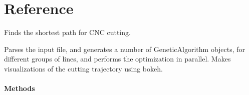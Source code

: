 \documentclass[letterpaper,10pt,english,openany,oneside]{sphinxmanual}
\begin{document}
\chapter{Reference}
\label{\detokenize{reference:module-cnc.optimization}}\label{\detokenize{reference:reference}}\label{\detokenize{reference::doc}}

\begin{fulllineitems}
\label{\detokenize{reference:cnc.optimization.CNCOptimizer}}
Finds the shortest path for CNC cutting.

Parses the input file, and generates a number of GeneticAlgorithm objects,
for different groups of lines, and performs the optimization in parallel.
Makes visualizations of the cutting trajectory using bokeh.
\subsubsection*{Methods}


\begin{savenotes}\sphinxatlongtablestart\begin{longtable}{}
\hline

\endfirsthead

%
{}\\
\hline

\endhead

\hline
{}\\
\endfoot

\endlastfoot


\end{longtable}
\end{savenotes}
\end{fulllineitems}
\end{document}

